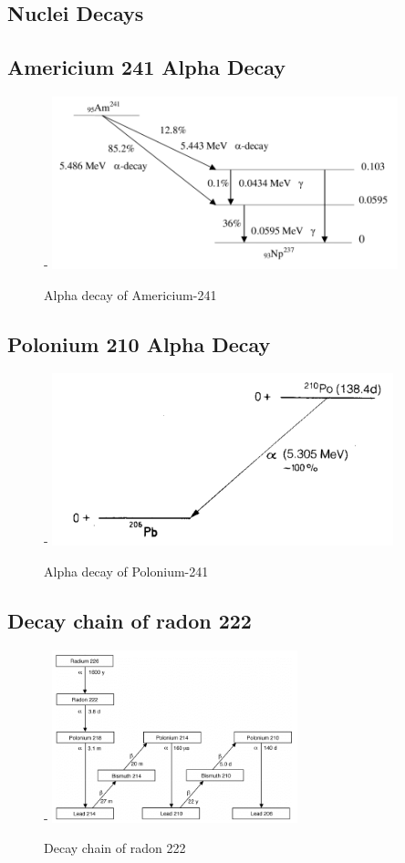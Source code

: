 \documentclass[a4paper]{article}
\begin{document}
\newpage
\begin{appendix}
  \listoffigures
  \listoftables
  \section{Nuclei Decays}
    \subsection{Americium 241 Alpha Decay} \label{ap:a1}
        \begin{figure}[H]-
        \centering
        \includegraphics[height=5cm]{Am241.png}
        \caption{Alpha decay of Americium-241 \cite{Malain_2019}}
        \end{figure}
    \subsection{Polonium 210 Alpha Decay} \label{ap:a1}
        \begin{figure}[H]-
        \centering
        \includegraphics[height=5cm]{po210.png}
        \caption{Alpha decay of Polonium-241 \cite{lieser_2001}}
        \end{figure}
    \subsection{Decay chain of radon 222} \label{ap:a2}
        \begin{figure}[H]-
        \centering
        \includegraphics[height=5cm]{radon222.png}
        \caption{Decay chain of radon 222 \cite{nhess-10-2051-2010}}
        \end{figure}

\end{appendix}
\end{document}
